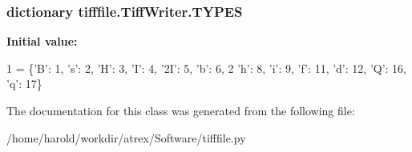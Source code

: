 \hypertarget{classtifffile_1_1TiffWriter_aae9c1bc9345c95fe80d2d31188e6e23d}{
\subsubsection[{T\-Y\-P\-E\-S}]{\setlength{\rightskip}{0pt plus 5cm}dictionary tifffile.\-Tiff\-Writer.\-T\-Y\-P\-E\-S\hspace{0.3cm}{\ttfamily [static]}}}\label{classtifffile_1_1TiffWriter_aae9c1bc9345c95fe80d2d31188e6e23d}
{\bfseries Initial value\-:}
\begin{DoxyCode}
1 = \{\textcolor{stringliteral}{'B'}: 1, \textcolor{stringliteral}{'s'}: 2, \textcolor{stringliteral}{'H'}: 3, \textcolor{stringliteral}{'I'}: 4, \textcolor{stringliteral}{'2I'}: 5, \textcolor{stringliteral}{'b'}: 6,
2              \textcolor{stringliteral}{'h'}: 8, \textcolor{stringliteral}{'i'}: 9, \textcolor{stringliteral}{'f'}: 11, \textcolor{stringliteral}{'d'}: 12, \textcolor{stringliteral}{'Q'}: 16, \textcolor{stringliteral}{'q'}: 17\}
\end{DoxyCode}


The documentation for this class was generated from the following file\-:\begin{DoxyCompactItemize}
\item 
/home/harold/workdir/atrex/\-Software/tifffile.\-py\end{DoxyCompactItemize}
